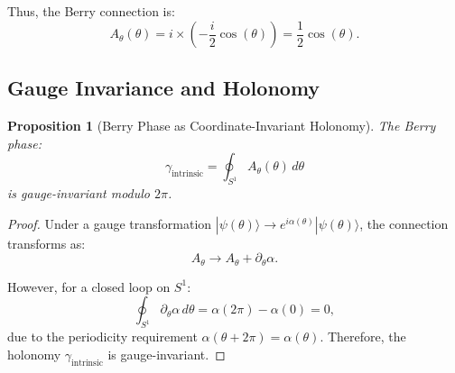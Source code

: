 \documentclass[%
 reprint,
 amsmath,amssymb,
 aps,
 prb,
]{revtex4-2}
\numberwithin{equation}{section}
\newtheorem{proposition}[theorem]{Proposition}
\theoremstyle{definition}
\theoremstyle{remark}
\newcommand{\Sone}{S^1}
\begin{document}
Thus, the Berry connection is:
\begin{equation}
A_\theta(\theta) = i \times \left(-\frac{i}{2}\cos(\theta)\right) = \frac{1}{2}\cos(\theta).
\label{eq:A_theta_explicit}
\end{equation}


\subsection{Gauge Invariance and Holonomy}

\begin{proposition}[Berry Phase as Coordinate-Invariant Holonomy]
\label{prop:gauge_invariant}
The Berry phase:
\begin{equation}
\gamma_{\text{intrinsic}} = \oint_{\Sone} A_\theta(\theta) \, d\theta
\label{eq:holonomy}
\end{equation}
is gauge-invariant modulo $2\pi$.
\end{proposition}

\begin{proof}
Under a gauge transformation $|\psi(\theta)\rangle \to e^{i\alpha(\theta)}|\psi(\theta)\rangle$, the connection transforms as:
\begin{equation}
A_\theta \to A_\theta + \partial_\theta \alpha.
\label{eq:gauge_transform}
\end{equation}

However, for a closed loop on $\Sone$:
\begin{equation}
\oint_{\Sone} \partial_\theta \alpha \, d\theta = \alpha(2\pi) - \alpha(0) = 0,
\label{eq:gauge_cancel}
\end{equation}
due to the periodicity requirement $\alpha(\theta + 2\pi) = \alpha(\theta)$. Therefore, the holonomy $\gamma_{\text{intrinsic}}$ is gauge-invariant.
\end{proof}
\end{document}
